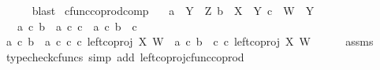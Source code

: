 \begin{isabellebody}
\ \ \ \ \isamarkupfalse%
\ blast\isanewline
{}\isamarkupfalse%
%
\endisatagproof
{\isafoldproof}%
%
\isadelimproof
%
\endisadelimproof
%
\isadelimdocument
%
\endisadelimdocument
%
\isatagdocument
%
\isamarkuptrue%
%
\endisatagdocument
{\isafolddocument}%
%
\isadelimdocument
%
\endisadelimdocument
{}\isamarkupfalse%
\ cfunc{\isacharunderscore}{\kern0pt}coprod{\isacharunderscore}{\kern0pt}comp{\isacharcolon}{\kern0pt}\isanewline
\ \ \ {\isachardoublequoteopen}a\ {\isacharcolon}{\kern0pt}\ Y\ {\isasymrightarrow}\ Z{\isachardoublequoteclose}\ {\isachardoublequoteopen}b\ {\isacharcolon}{\kern0pt}\ X\ {\isasymrightarrow}\ Y{\isachardoublequoteclose}\ {\isachardoublequoteopen}c\ {\isacharcolon}{\kern0pt}\ W\ {\isasymrightarrow}\ Y{\isachardoublequoteclose}\isanewline
\ \ \ {\isachardoublequoteopen}{\isacharparenleft}{\kern0pt}a\ {\isasymcirc}\isactrlsub c\ b{\isacharparenright}{\kern0pt}\ {\isasymamalg}\ {\isacharparenleft}{\kern0pt}a\ {\isasymcirc}\isactrlsub c\ c{\isacharparenright}{\kern0pt}\ {\isacharequal}{\kern0pt}\ a\ {\isasymcirc}\isactrlsub c\ {\isacharparenleft}{\kern0pt}b\ {\isasymamalg}\ c{\isacharparenright}{\kern0pt}{\isachardoublequoteclose}\isanewline
%
\isadelimproof
%
\endisadelimproof
%
\isatagproof
{}\isamarkupfalse%
\ {\isacharminus}{\kern0pt}\isanewline
\ \ \isamarkupfalse%
\ {\isachardoublequoteopen}{\isacharparenleft}{\kern0pt}{\isacharparenleft}{\kern0pt}a\ {\isasymcirc}\isactrlsub c\ b{\isacharparenright}{\kern0pt}\ {\isasymamalg}\ {\isacharparenleft}{\kern0pt}a\ {\isasymcirc}\isactrlsub c\ c{\isacharparenright}{\kern0pt}{\isacharparenright}{\kern0pt}\ {\isasymcirc}\isactrlsub c\ {\isacharparenleft}{\kern0pt}left{\isacharunderscore}{\kern0pt}coproj\ X\ W{\isacharparenright}{\kern0pt}\ {\isacharequal}{\kern0pt}\ a\ {\isasymcirc}\isactrlsub c\ {\isacharparenleft}{\kern0pt}b\ {\isasymamalg}\ c{\isacharparenright}{\kern0pt}\ {\isasymcirc}\isactrlsub c\ {\isacharparenleft}{\kern0pt}left{\isacharunderscore}{\kern0pt}coproj\ X\ W{\isacharparenright}{\kern0pt}{\isachardoublequoteclose}\isanewline
\ \ \ \ \isamarkupfalse%
\ assms\ \isamarkupfalse%
\ {\isacharparenleft}{\kern0pt}typecheck{\isacharunderscore}{\kern0pt}cfuncs{\isacharcomma}{\kern0pt}\ simp\ add{\isacharcolon}{\kern0pt}\ left{\isacharunderscore}{\kern0pt}coproj{\isacharunderscore}{\kern0pt}cfunc{\isacharunderscore}{\kern0pt}coprod{\isacharparenright}{\kern0pt}\isanewline
\ \ \isamarkupfalse%

\end{isabellebody}
